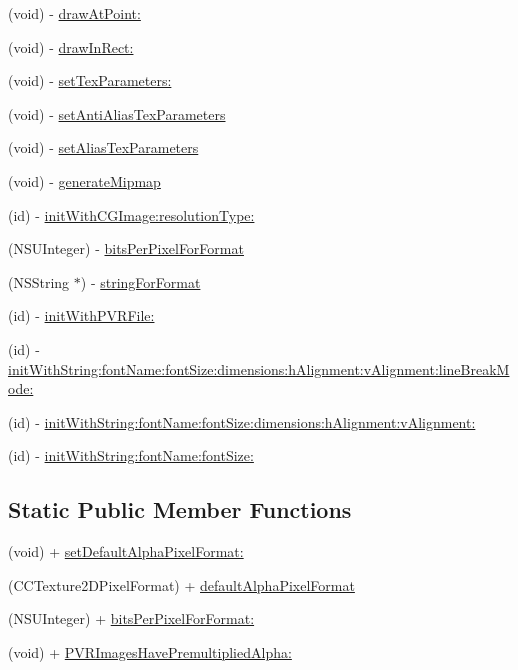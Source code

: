 \begin{DoxyCompactItemize}
\item 
(void) -\/ \hyperlink{class_c_c_texture2_d_a6bd05327db057f1e318920fad6d5f84e}{draw\-At\-Point\-:}
\item 
(void) -\/ \hyperlink{class_c_c_texture2_d_a793f50f586136d10c6e2ca3882b22cda}{draw\-In\-Rect\-:}
\item 
(void) -\/ \hyperlink{class_c_c_texture2_d_a9cd0e19948c328609ec0c849a6cf0876}{set\-Tex\-Parameters\-:}
\item 
(void) -\/ \hyperlink{class_c_c_texture2_d_ae93d798c556a1550f1f553c33d2ab371}{set\-Anti\-Alias\-Tex\-Parameters}
\item 
(void) -\/ \hyperlink{class_c_c_texture2_d_a8dd7c5360b4d52d0ff83329292c0719e}{set\-Alias\-Tex\-Parameters}
\item 
(void) -\/ \hyperlink{class_c_c_texture2_d_a4b5fdc85363ee66f65d39a9e1f3489d0}{generate\-Mipmap}
\item 
(id) -\/ \hyperlink{class_c_c_texture2_d_a2e2e11c96285e84fa884b5547a81c7f5}{init\-With\-C\-G\-Image\-:resolution\-Type\-:}
\item 
(N\-S\-U\-Integer) -\/ \hyperlink{class_c_c_texture2_d_a1ebfbdea4f0260e845db08cb65fdcac2}{bits\-Per\-Pixel\-For\-Format}
\item 
(N\-S\-String $\ast$) -\/ \hyperlink{class_c_c_texture2_d_abc5c5f922c9cbb1bce08f01e7d3ac3c5}{string\-For\-Format}
\item 
(id) -\/ \hyperlink{class_c_c_texture2_d_aad368c7ee5b5b81725772b8753a2aa51}{init\-With\-P\-V\-R\-File\-:}
\item 
(id) -\/ \hyperlink{class_c_c_texture2_d_a65fea0340c96ad30c38ccb32af4c668d}{init\-With\-String\-:font\-Name\-:font\-Size\-:dimensions\-:h\-Alignment\-:v\-Alignment\-:line\-Break\-Mode\-:}
\item 
(id) -\/ \hyperlink{class_c_c_texture2_d_a0016e5c8eec117def08f1d6a9400bf58}{init\-With\-String\-:font\-Name\-:font\-Size\-:dimensions\-:h\-Alignment\-:v\-Alignment\-:}
\item 
(id) -\/ \hyperlink{class_c_c_texture2_d_a3c66e66d0fb730df344c9dd579d0d358}{init\-With\-String\-:font\-Name\-:font\-Size\-:}
\end{DoxyCompactItemize}
\subsection*{Static Public Member Functions}
\begin{DoxyCompactItemize}
\item 
(void) + \hyperlink{class_c_c_texture2_d_add7db64ac4efbfb1570986c2f0f55ce6}{set\-Default\-Alpha\-Pixel\-Format\-:}
\item 
(C\-C\-Texture2\-D\-Pixel\-Format) + \hyperlink{class_c_c_texture2_d_a8c0007c1084be70ca6ab2d3039fbd4da}{default\-Alpha\-Pixel\-Format}
\item 
(N\-S\-U\-Integer) + \hyperlink{class_c_c_texture2_d_a72b15a812752a05d69a4a9100773c21a}{bits\-Per\-Pixel\-For\-Format\-:}
\item 
(void) + \hyperlink{class_c_c_texture2_d_a129338ae7dc5eccd0bc97b8af0a81b2a}{P\-V\-R\-Images\-Have\-Premultiplied\-Alpha\-:}
\end{DoxyCompactItemize}
